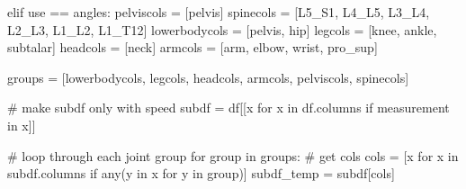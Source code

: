\documentclass[
  letterpaper,
  DIV=11,
  numbers=noendperiod]{scrreprt}
\newenvironment{Shaded}{\begin{snugshade}}{\end{snugshade}}
\newcommand{\BuiltInTok}[1]{\textcolor[rgb]{0.00,0.23,0.31}{#1}}
\newcommand{\CommentTok}[1]{\textcolor[rgb]{0.37,0.37,0.37}{#1}}
\newcommand{\ControlFlowTok}[1]{\textcolor[rgb]{0.00,0.23,0.31}{#1}}
\newcommand{\KeywordTok}[1]{\textcolor[rgb]{0.00,0.23,0.31}{#1}}
\newcommand{\NormalTok}[1]{\textcolor[rgb]{0.00,0.23,0.31}{#1}}
\newcommand{\OperatorTok}[1]{\textcolor[rgb]{0.37,0.37,0.37}{#1}}
\newcommand{\StringTok}[1]{\textcolor[rgb]{0.13,0.47,0.30}{#1}}
\begin{document}
\begin{Shaded}
\begin{Highlighting}[]
    \ControlFlowTok{elif}\NormalTok{ use }\OperatorTok{==} \StringTok{\textquotesingle{}angles\textquotesingle{}}\NormalTok{:}
\NormalTok{        pelviscols }\OperatorTok{=}\NormalTok{ [}\StringTok{\textquotesingle{}pelvis\textquotesingle{}}\NormalTok{]}
\NormalTok{        spinecols }\OperatorTok{=}\NormalTok{ [}\StringTok{\textquotesingle{}L5\_S1\textquotesingle{}}\NormalTok{, }\StringTok{\textquotesingle{}L4\_L5\textquotesingle{}}\NormalTok{, }\StringTok{\textquotesingle{}L3\_L4\textquotesingle{}}\NormalTok{, }\StringTok{\textquotesingle{}L2\_L3\textquotesingle{}}\NormalTok{, }\StringTok{\textquotesingle{}L1\_L2\textquotesingle{}}\NormalTok{, }\StringTok{\textquotesingle{}L1\_T12\textquotesingle{}}\NormalTok{]}
\NormalTok{        lowerbodycols }\OperatorTok{=}\NormalTok{ [}\StringTok{\textquotesingle{}pelvis\textquotesingle{}}\NormalTok{, }\StringTok{\textquotesingle{}hip\textquotesingle{}}\NormalTok{]}
\NormalTok{        legcols }\OperatorTok{=}\NormalTok{ [}\StringTok{\textquotesingle{}knee\textquotesingle{}}\NormalTok{, }\StringTok{\textquotesingle{}ankle\textquotesingle{}}\NormalTok{, }\StringTok{\textquotesingle{}subtalar\textquotesingle{}}\NormalTok{]}
\NormalTok{        headcols }\OperatorTok{=}\NormalTok{ [}\StringTok{\textquotesingle{}neck\textquotesingle{}}\NormalTok{]}
\NormalTok{        armcols }\OperatorTok{=}\NormalTok{ [}\StringTok{\textquotesingle{}arm\textquotesingle{}}\NormalTok{, }\StringTok{\textquotesingle{}elbow\textquotesingle{}}\NormalTok{, }\StringTok{\textquotesingle{}wrist\textquotesingle{}}\NormalTok{, }\StringTok{\textquotesingle{}pro\_sup\textquotesingle{}}\NormalTok{]}

\NormalTok{        groups }\OperatorTok{=}\NormalTok{ [lowerbodycols, legcols, headcols, armcols, pelviscols, spinecols]}

    \CommentTok{\# make subdf only with speed}
\NormalTok{    subdf }\OperatorTok{=}\NormalTok{ df[[x }\ControlFlowTok{for}\NormalTok{ x }\KeywordTok{in}\NormalTok{ df.columns }\ControlFlowTok{if}\NormalTok{ measurement }\KeywordTok{in}\NormalTok{ x]]}

    \CommentTok{\# loop through each joint group}
    \ControlFlowTok{for}\NormalTok{ group }\KeywordTok{in}\NormalTok{ groups:}
        \CommentTok{\# get cols}
\NormalTok{        cols }\OperatorTok{=}\NormalTok{ [x }\ControlFlowTok{for}\NormalTok{ x }\KeywordTok{in}\NormalTok{ subdf.columns }\ControlFlowTok{if} \BuiltInTok{any}\NormalTok{(y }\KeywordTok{in}\NormalTok{ x }\ControlFlowTok{for}\NormalTok{ y }\KeywordTok{in}\NormalTok{ group)]}
\NormalTok{        subdf\_temp }\OperatorTok{=}\NormalTok{ subdf[cols]}


\end{Highlighting}
\end{Shaded}
\end{document}
